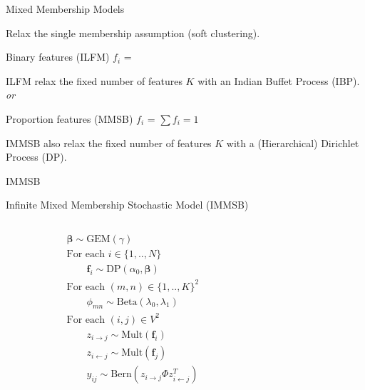 \begin{frame}[c]{Mixed Membership Models}

    Relax the single membership assumption (soft clustering).

    \begin{block}{Binary features (ILFM)}
        $f_i$ = \raisebox{-2pt}{}
    \end{block}
    ILFM relax the fixed number of features $K$ with an Indian Buffet Process (IBP). \\

    \vspace{0.2cm}
    \emph{or}
    \vspace{0.2cm}

    \begin{block}{Proportion features (MMSB)}
        $f_i$ = \raisebox{-2pt}{} \hspace{2em} $\sum f_i=1$
    \end{block}
    IMMSB also relax the fixed number of features $K$ with a (Hierarchical) Dirichlet Process (DP). \\
    
\end{frame}

\begin{frame}[c]{IMMSB}

    Infinite Mixed Membership Stochastic Model (IMMSB) 
    \vspace{1cm}

    \begin{columns}[t]
        \begin{column}{0.5\textwidth}
            \vspace{-5cm}
            \begin{align*}
                &\bm{\beta} \sim \textrm{GEM}(\gamma)\\
                &\textrm{For each } i \in \{1, .., N\}  \\
                &\qquad\bm{f}_i \sim \textrm{DP}(\alpha_0, \bm{\beta})\\
                &\textrm{For each }  (m,n) \in \{1,..,K\}^2 \\
                &\qquad\phi_{mn} \sim \mathrm{Beta}(\lambda_0,\lambda_1)\\
                &\textrm{For each } (i,j) \in V^2 \\
                &\qquad z_{i \rightarrow j} \sim \mbox{Mult}(\bm{f}_i)\\
                &\qquad z_{i \leftarrow j} \sim \mbox{Mult}(\bm{f}_j)\\
                &\qquad y_{ij} \sim \mathrm{Bern}({z_{i \rightarrow j} \Phi z_{i \leftarrow j}^T})
            \end{align*}
        \end{column}
        \begin{column}{0.5\textwidth}
            \scalebox{0.88}{}
        \end{column}
    \end{columns}

\end{frame}

